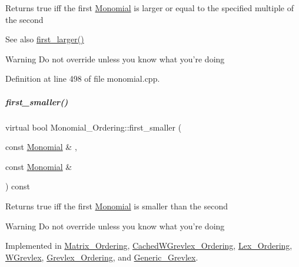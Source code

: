 \begin{DoxyReturn}{Returns}
{\ttfamily true} iff the first \hyperlink{group__polygroup_class_monomial}{Monomial} is larger or equal to the specified multiple of the second 
\end{DoxyReturn}
\begin{DoxySeeAlso}{See also}
\hyperlink{group__orderinggroup_aed41fe82e1ca5cd287a93d287fee7c20}{first\+\_\+larger()} 
\end{DoxySeeAlso}
\begin{DoxyWarning}{Warning}
Do not override unless you know what you're doing 
\end{DoxyWarning}


Definition at line 498 of file monomial.\+cpp.

\mbox{\label{group__orderinggroup_ab6c02638f87382f7a9a95b994e9a5dfb}} 
\subparagraph{\texorpdfstring{first\+\_\+smaller()}{first\_smaller()}}
{\footnotesize\ttfamily virtual bool Monomial\+\_\+\+Ordering\+::first\+\_\+smaller (\begin{DoxyParamCaption}\item[{const \hyperlink{group__polygroup_class_monomial}{Monomial} \&}]{,  }\item[{const \hyperlink{group__polygroup_class_monomial}{Monomial} \&}]{ }\end{DoxyParamCaption}) const\hspace{0.3cm}{\ttfamily [pure virtual]}}

\begin{DoxyReturn}{Returns}
{\ttfamily true} iff the first \hyperlink{group__polygroup_class_monomial}{Monomial} is smaller than the second 
\end{DoxyReturn}
\begin{DoxyWarning}{Warning}
Do not override unless you know what you're doing 
\end{DoxyWarning}


Implemented in \hyperlink{group__orderinggroup_ab7881ff6bbc52d02bf786ef8ab8c5c37}{Matrix\+\_\+\+Ordering}, \hyperlink{group__orderinggroup_a131b09d8226c2dc5f0718f90ab8e009f}{Cached\+W\+Grevlex\+\_\+\+Ordering}, \hyperlink{group__orderinggroup_ae42ea2c7b8fa45bcb46e56480d5f8abb}{Lex\+\_\+\+Ordering}, \hyperlink{group__orderinggroup_a0e4327be4c18de7180ba2cd8c2f9d549}{W\+Grevlex}, \hyperlink{group__orderinggroup_abb1afdfa6ace5b90e425d0645e278c67}{Grevlex\+\_\+\+Ordering}, and \hyperlink{group__orderinggroup_a48ba39468e17d826988b28f5d871d868}{Generic\+\_\+\+Grevlex}.

